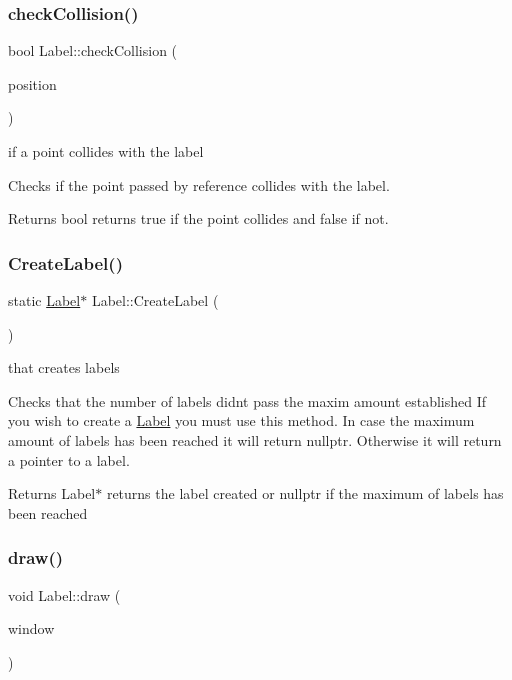 \subsubsection{\texorpdfstring{check\+Collision()}{checkCollision()}}
{\footnotesize\ttfamily bool Label\+::check\+Collision (\begin{DoxyParamCaption}\item[{const sf\+::\+Vector2f \&}]{position }\end{DoxyParamCaption})}

if a point collides with the label

Checks if the point passed by reference collides with the label.

\begin{DoxyReturn}{Returns}
bool returns true if the point collides and false if not. 
\end{DoxyReturn}
\mbox{\label{class_label_a9331db7ea12bb0bfa69910b9aa2229a4}} 
\subsubsection{\texorpdfstring{Create\+Label()}{CreateLabel()}}
{\footnotesize\ttfamily static \hyperlink{class_label}{Label}$\ast$ Label\+::\+Create\+Label (\begin{DoxyParamCaption}{ }\end{DoxyParamCaption})\hspace{0.3cm}{\ttfamily [static]}}

that creates labels

Checks that the number of labels didn\textquotesingle{}t pass the maxim amount established If you wish to create a \hyperlink{class_label}{Label} you must use this method. In case the maximum amount of labels has been reached it will return nullptr. Otherwise it will return a pointer to a label.

\begin{DoxyReturn}{Returns}
Label$\ast$ returns the label created or nullptr if the maximum of labels has been reached 
\end{DoxyReturn}
\mbox{\label{class_label_acaf5dfeeab3e46b5795b8cd24c9d94fe}} 
\subsubsection{\texorpdfstring{draw()}{draw()}}
{\footnotesize\ttfamily void Label\+::draw (\begin{DoxyParamCaption}\item[{sf\+::\+Render\+Window \&}]{window }\end{DoxyParamCaption})}

